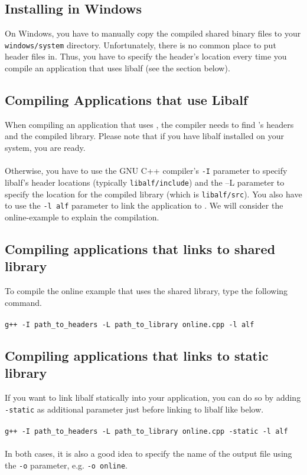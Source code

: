 \subsection*{Installing in Windows}
On Windows, you have to manually copy the compiled shared binary files to your \texttt{windows/system} directory. Unfortunately, there is no common place to put header files in. Thus, you have to specify the header’s location every time you compile an application that uses libalf (see the section below).

\subsection{Compiling Applications that use Libalf}
When compiling an application that uses \libalf, the compiler needs to find \libalf’s headers and the compiled library. Please note that if you have libalf installed on your system, you are ready. 
\paragraph{}
Otherwise, you have to use the GNU C++ compiler’s \texttt{-I} parameter to specify libalf’s header locations (typically \texttt{libalf/include}) and the –L parameter to specify the location for the compiled library (which is \texttt{libalf/src}). You also have to use the \texttt{-l alf} parameter to link the application to \libalf.
We will consider the online-example to explain the compilation.
\subsection*{Compiling applications that links to shared library}
To compile the online example that uses the shared library, type the following command.
\\ \\
\texttt{g++ -I path\_to\_headers -L path\_to\_library online.cpp -l alf}
\subsection*{Compiling applications that links to static library}
If you want to link libalf statically into your application, you can do so by adding \texttt{-static} as additional parameter just before linking to libalf like below.
\\ \\
\texttt{g++ -I path\_to\_headers -L path\_to\_library online.cpp -static -l alf}
\paragraph{}
In both cases, it is also a good idea to specify the name of the output file using the \texttt{-o} parameter, e.g. \texttt{-o online}.

